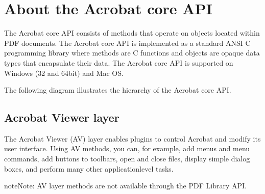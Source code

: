 \documentclass[letterpaper,12pt,english,openany,oneside]{sphinxmanual}
\begin{document}
\section{About the Acrobat core API}
\label{\detokenize{index:about-the-acrobat-core-api}}
The Acrobat core API consists of methods that operate on objects located within PDF documents. The Acrobat core API is implemented as a standard ANSI C programming library where methods are C functions and objects are opaque data types that encapsulate their data. The Acrobat core API is supported on Windows (32\sphinxhyphen{} and 64\sphinxhyphen{}bit) and Mac OS.

The following diagram illustrates the hierarchy of the Acrobat core API.

\noindent{}


\subsection{Acrobat Viewer layer}
\label{\detokenize{index:acrobat-viewer-layer}}
The Acrobat Viewer (AV) layer enables plugins to control Acrobat and modify its user interface. Using AV methods, you can, for example, add menus and menu commands, add buttons to toolbars, open and close files, display simple dialog boxes, and perform many other application\sphinxhyphen{}level tasks.

\begin{sphinxadmonition}{note}{Note:}
AV layer methods are not available through the PDF Library API.
\end{sphinxadmonition}
\end{document}
